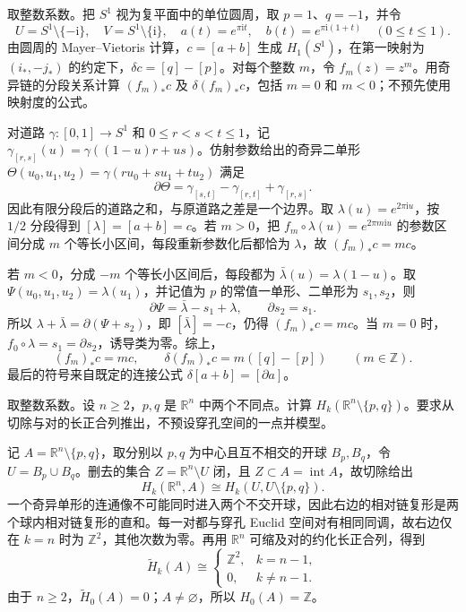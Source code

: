 \begin{exercise}\label{g2:ex:circle-MV-connecting-sign}
	取整数系数。把 \(S^1\) 视为复平面中的单位圆周，取 \(p=1\)、\(q=-1\)，并令
	\[
		U=S^1\setminus\{-\mathrm{i}\},\quad
		V=S^1\setminus\{\mathrm{i}\},\quad
		a(t)=e^{\pi\mathrm{i}t},\quad
		b(t)=e^{\pi\mathrm{i}(1+t)}\quad(0\le t\le1).
	\]
	由圆周的 Mayer–Vietoris 计算，\(c=[a+b]\) 生成 \(H_1(S^1)\)，在第一映射为 \((i_*,-j_*)\) 的约定下，\(\delta c=[q]-[p]\)。对每个整数 \(m\)，令 \(f_m(z)=z^m\)。用奇异链的分段关系计算 \((f_m)_*c\) 及 \(\delta(f_m)_*c\)，包括 \(m=0\) 和 \(m<0\)；不预先使用映射度的公式。
\end{exercise}
\begin{solution}
	对道路 \(\gamma:[0,1]\to S^1\) 和 \(0\le r<s<t\le1\)，记 \(\gamma_{[r,s]}(u)=\gamma((1-u)r+us)\)。仿射参数给出的奇异二单形 \(\Theta(u_0,u_1,u_2)=\gamma(ru_0+su_1+tu_2)\) 满足
	\[
		\partial\Theta
		=\gamma_{[s,t]}-\gamma_{[r,t]}+\gamma_{[r,s]}.
	\]
	因此有限分段后的道路之和，与原道路之差是一个边界。取 \(\lambda(u)=e^{2\pi\mathrm{i}u}\)，按 \(1/2\) 分段得到 \([\lambda]=[a+b]=c\)。若 \(m>0\)，把 \(f_m\circ\lambda(u)=e^{2\pi m\mathrm{i}u}\) 的参数区间分成 \(m\) 个等长小区间，每段重新参数化后都恰为 \(\lambda\)，故 \((f_m)_*c=mc\)。

	若 \(m<0\)，分成 \(-m\) 个等长小区间后，每段都为 \(\bar\lambda(u)=\lambda(1-u)\)。取 \(\Psi(u_0,u_1,u_2)=\lambda(u_1)\)，并记值为 \(p\) 的常值一单形、二单形为 \(s_1,s_2\)，则
	\[
		\partial\Psi=\bar\lambda-s_1+\lambda,\qquad
		\partial s_2=s_1.
	\]
	所以 \(\lambda+\bar\lambda=\partial(\Psi+s_2)\)，即 \([\bar\lambda]=-c\)，仍得 \((f_m)_*c=mc\)。当 \(m=0\) 时，\(f_0\circ\lambda=s_1=\partial s_2\)，诱导类为零。综上，
	\[
		(f_m)_*c=mc,\qquad
		\delta(f_m)_*c=m([q]-[p])\qquad(m\in\mathbb Z).
	\]
	最后的符号来自既定的连接公式 \(\delta[a+b]=[\partial a]\)。
\end{solution}

\begin{exercise}\label{g2:ex:two-punctures}
	取整数系数。设 \(n\ge2\)，\(p,q\) 是 \(\mathbb R^n\) 中两个不同点。计算 \(H_k(\mathbb R^n\setminus\{p,q\})\)。要求从切除与对的长正合列推出，不预设穿孔空间的一点并模型。
\end{exercise}
\begin{solution}
	记 \(A=\mathbb R^n\setminus\{p,q\}\)，取分别以 \(p,q\) 为中心且互不相交的开球 \(B_p,B_q\)，令 \(U=B_p\cup B_q\)。删去的集合 \(Z=\mathbb R^n\setminus U\) 闭，且 \(Z\subset A=\operatorname{int}A\)，故切除给出
	\[
		H_k(\mathbb R^n,A)\cong H_k(U,U\setminus\{p,q\}).
	\]
	一个奇异单形的连通像不可能同时进入两个不交开球，因此右边的相对链复形是两个球内相对链复形的直和。每一对都与穿孔 Euclid 空间对有相同同调，故右边仅在 \(k=n\) 时为 \(\mathbb Z^2\)，其他次数为零。再用 \(\mathbb R^n\) 可缩及对的约化长正合列，得到
	\[
		\widetilde H_k(A)\cong
		\begin{cases}\mathbb Z^2,&k=n-1,\\0,&k\ne n-1.\end{cases}
	\]
	由于 \(n\ge2\)，\(\widetilde H_0(A)=0\)；\(A\ne\varnothing\)，所以 \(H_0(A)=\mathbb Z\)。
\end{solution}

